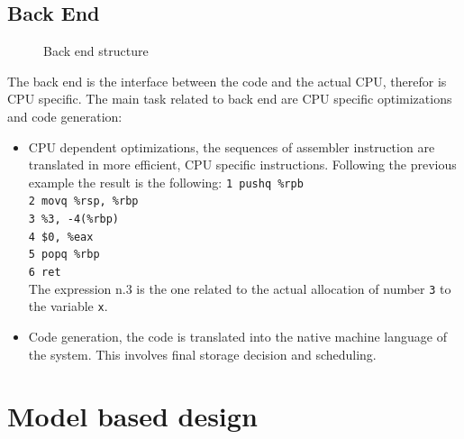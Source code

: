 \documentclass[../main.tex]{subfiles}
\begin{document}
\subsection{Back End}
\begin{figure}[h]
  \centering
{}
  \caption{Back end structure}
\end{figure}
The back end is the interface between the code and the actual CPU, therefor is CPU specific. The main task related to back end are CPU specific optimizations and code generation:
\begin{itemize}
    \item CPU dependent optimizations, the sequences of assembler instruction are translated in more efficient, CPU specific instructions. Following the previous example the result is the following:
        \texttt{1 pushq \%rpb}\\
        \texttt{2 movq \%rsp, \%rbp}\\
        \texttt{3 \%3, -4(\%rbp)}\\
        \texttt{4 \$0, \%eax}\\
        \texttt{5 popq \%rbp}\\
        \texttt{6 ret}\\
    The expression n.3 is the one related to the actual allocation of number \texttt{3} to the variable \texttt{x}.
    \item Code generation, the code is translated into the native machine language of the system. This involves final storage decision and scheduling. 
\end{itemize}

\section{Model based design}
\end{document}
